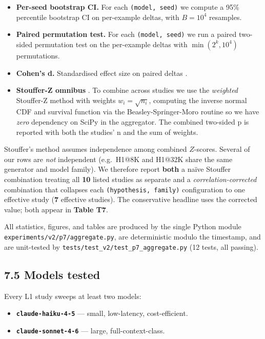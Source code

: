 \begin{itemize}
\tightlist
\item
  \textbf{Per-seed bootstrap CI.} For each \texttt{(model,\ seed)} we compute a 95\% percentile bootstrap CI \citep{efron1979bootstrap} on per-example deltas, with \(B=10^4\) resamples.
\item
  \textbf{Paired permutation test.} For each \texttt{(model,\ seed)} we run a paired two-sided permutation test \citep{good2005permutation} on the per-example deltas with \(\min(2^k, 10^4)\) permutations.
\item
  \textbf{Cohen's d.} Standardised effect size on paired deltas \citep{cohen1988statistical}.
\item
  \textbf{Stouffer-Z omnibus} \citep{stouffer1949combining, liptak1958combining}. To combine across studies we use the \emph{weighted} Stouffer-Z method with weights \(w_i = \sqrt{n_i}\), computing the inverse normal CDF and survival function via the Beasley-Springer-Moro routine \citep{beasley1977normal, moro1995tail} so we have \emph{zero} dependency on SciPy in the aggregator. The combined two-sided p is reported with both the studies' n and the sum of weights.
\end{itemize}

Stouffer's method assumes independence among combined \(Z\)-scores. Several of our rows are \emph{not} independent (e.g.~H1@8K and H1@32K share the same generator and model family). We therefore report \textbf{both} a naïve Stouffer combination treating all \textbf{10} listed studies as separate and a \emph{correlation-corrected} combination that collapses each \texttt{(hypothesis,\ family)} configuration to one effective study (\textbf{7} effective studies). The conservative headline uses the corrected value; both appear in \textbf{Table T7}.

All statistics, figures, and tables are produced by the single Python module \texttt{experiments/v2/p7/aggregate.py}, are deterministic modulo the timestamp, and are unit-tested by \texttt{tests/test\_v2/test\_p7\_aggregate.py} (12 tests, all passing).

\subsection{7.5 Models tested}\label{models-tested}

Every L1 study sweeps at least two models:

\begin{itemize}
\tightlist
\item
  \textbf{\texttt{claude-haiku-4-5}} --- small, low-latency, cost-efficient.
\item
  \textbf{\texttt{claude-sonnet-4-6}} --- large, full-context-class.
\end{itemize}

